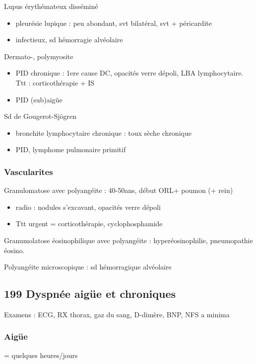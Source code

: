 \documentclass[11pt]{article}
\begin{document}
Lupus érythémateux disséminé 

\begin{itemize}
\item pleurésie lupique : peu abondant, svt bilatéral, svt + péricardite
\item infectieux, sd hémorragie alvéolaire
\end{itemize}

Dermato-, polymyosite

\begin{itemize}
\item PID chronique : 1ere cause DC, opacités verre dépoli, \gls{LBA} lymphocytaire.
Ttt : corticothérapie + IS
\item PID (sub)aigüe
\end{itemize}

Sd de Gougerot-Sjögren

\begin{itemize}
\item bronchite lymphocytaire chronique : toux sèche chronique
\item PID, lymphome pulmonaire primitif
\end{itemize}


\subsubsection{Vascularites}
\label{sec:org9d19f2c}
Granulomatose avec polyangéite : 40-50ans, début ORL+ poumon (+ rein)

\begin{itemize}
\item radio : nodules s'excavant, opacités verre dépoli
\item Ttt urgent = corticothérapie, cyclophosphamide
\end{itemize}

Granumolatose éosinophilique avec polyangéite :  hyperéosinophilie, pneumopathie
éosino.

Polyangéite microscopique : sd hémorragique alvéolaire

\subsection{199 \textdagger{} Dyspnée aigüe et chroniques}
\label{sec:orgc31b98b}
\label{sec:199_dyspnee_aigue_et_chronique}
Examens : ECG, RX thorax, gaz du sang, D-dimère, BNP, NFS a minima

\subsubsection{Aigüe}
\label{sec:org88e6d1d}
= quelques heures/jours
\end{document}
